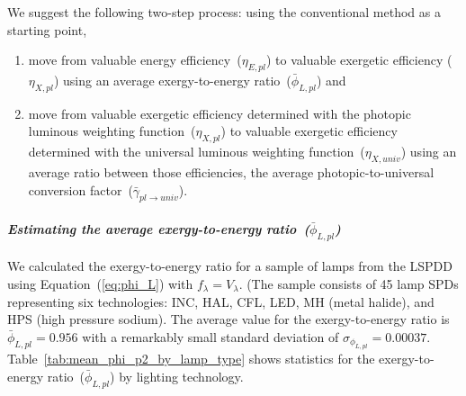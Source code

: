 \documentclass[energies,article,accept,moreauthors,pdftex]{Definitions/mdpi}\usepackage[]{graphicx}\usepackage[]{color}
\newcommand{\gammaratavg}{\bar{\gamma}_{pl\rightarrow{}univ}}
\begin{document}
We suggest the following two-step process:  
using the conventional method as a starting point,
%
\begin{enumerate}

  \item move from valuable energy efficiency~($\eta_{E,pl}$)
        to valuable exergetic efficiency ($\eta_{X,pl}$)
        using an average exergy-to-energy ratio~($\bar{\phi}_{L,pl}$) and 

  \item move from valuable exergetic efficiency determined with the photopic luminous weighting function~($\eta_{X,pl}$)
        to valuable exergetic efficiency determined with the universal luminous weighting function~($\eta_{X,univ}$)
        using an average ratio between those efficiencies,
        the average photopic-to-universal conversion factor~($\gammaratavg{}$).

\end{enumerate}






\paragraph{\emph{Estimating the average exergy-to-energy ratio~($\bar{\phi}_{L,pl}$)}} %

We calculated the exergy-to-energy ratio for a sample of lamps from the LSPDD \cite{aube2013}
using Equation~(\ref{eq:phi_L}) with $f_\lambda = V_\lambda$. 
(The sample consists of 45 lamp SPDs representing six technologies: 
INC, HAL, CFL, LED, MH (metal halide), and HPS (high pressure sodium).
The average value for the exergy-to-energy ratio is
$\bar{\phi}_{L,pl} = 0.956$ 
with a remarkably small standard deviation of $\sigma_{\phi_{L,pl}} = 0.00037$. Table~\ref{tab:mean_phi_p2_by_lamp_type} shows 
statistics for the exergy-to-energy ratio~($\bar{\phi}_{L,pl}$)
by lighting technology.
\end{document}
